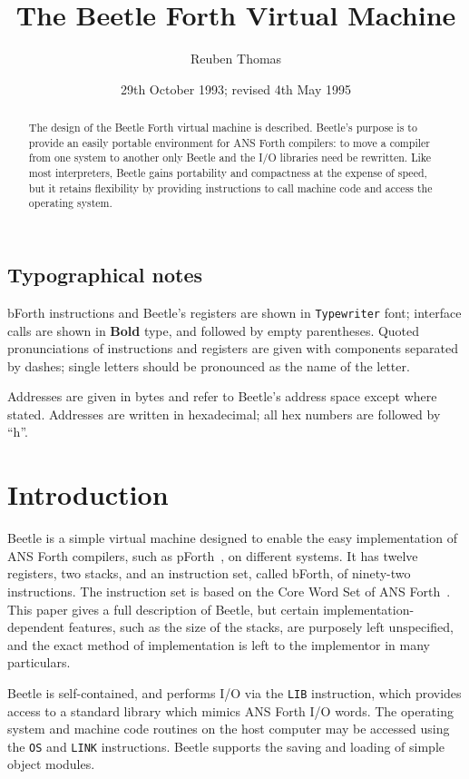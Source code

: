 \documentclass{article}
\title{The Beetle Forth Virtual Machine}
\author{Reuben Thomas}
\date{29th October 1993; revised 4th May 1995}
\newlength{\pronunc}\pronunc=1.7in
\begin{document}
\maketitle

\begin{abstract}
\noindent The design of the Beetle Forth virtual machine is described.
Beetle's purpose is to provide an easily portable environment for ANS Forth
compilers: to move a compiler from one system to another only Beetle and the I/O
libraries need be rewritten. Like most interpreters, Beetle gains portability
and compactness at the expense of speed, but it retains flexibility by providing
instructions to call machine code and access the operating system.
\end{abstract}


\subsection*{Typographical notes}

bForth instructions and Beetle's registers are shown in {\tt Typewriter} font;
interface calls are shown in {\bf Bold} type, and followed by empty parentheses.
Quoted pronunciations of instructions and registers are given with components
separated by dashes; single letters should be pronounced as the name of the
letter.

Addresses are given in bytes and refer to Beetle's address space except where
stated. Addresses are written in hexadecimal; all hex numbers are followed by
``h''.


\section{Introduction}

Beetle is a simple virtual machine designed to enable the easy implementation
of ANS Forth compilers, such as pForth~\cite{beetledis}, on different systems.
It has twelve registers, two stacks, and an instruction set, called bForth, of
ninety-two instructions. The instruction set is based on the Core Word Set of
ANS Forth~\cite{ANSIforth}. This paper gives a full description of Beetle, but
certain implementation-dependent features, such as the size of the stacks, are
purposely left unspecified, and the exact method of implementation is left to
the implementor in many particulars.

Beetle is self-contained, and performs I/O via the {\tt LIB} instruction, which
provides access to a standard library which mimics ANS Forth I/O words. The
operating system and machine code routines on the host computer may be accessed
using the {\tt OS} and {\tt LINK} instructions. Beetle supports the saving and
loading of simple object modules.
\end{document}

